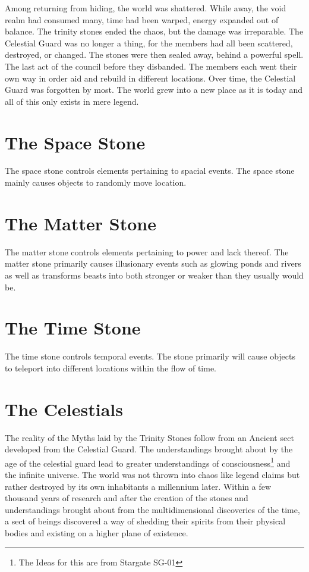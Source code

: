 Among returning from hiding, the world was shattered. While away, the void realm had consumed many, time had been warped, energy expanded out of balance. The trinity stones ended the chaos, but the damage was irreparable. The Celestial Guard was no longer a thing, for the members had all been scattered, destroyed, or changed. The stones were then sealed away, behind a powerful spell. The last act of the council before they disbanded. The members each went their own way in order aid and rebuild in different locations. Over time, the Celestial Guard was forgotten by most. The world grew into a new place as it is today and all of this only exists in mere legend.  

\section{The Space Stone}

The space stone controls elements pertaining to spacial events. The space stone mainly causes objects to randomly move location.


\section{The Matter Stone}

The matter stone controls elements pertaining to power and lack thereof. The matter stone primarily causes illusionary events such as glowing ponds and rivers as well as transforms beasts into both stronger or weaker than they usually would be.

\section{The Time Stone}

The time stone controls temporal events. The stone primarily will cause objects to teleport into different locations within the flow of time.

\section{The Celestials}

The reality of the Myths laid by the Trinity Stones follow from an Ancient sect developed from the Celestial Guard. The understandings brought about by the age of the celestial guard lead to greater understandings of consciousness\footnote{The Ideas for this are from Stargate SG-01} and the infinite universe. The world was not thrown into chaos like legend claims but rather destroyed by its own inhabitants a millennium later. Within a few thousand years of research and after the creation of the stones and understandings brought about from the multidimensional discoveries of the time, a sect of beings discovered a way of shedding their spirits from their physical bodies and existing on a higher plane of existence. 

